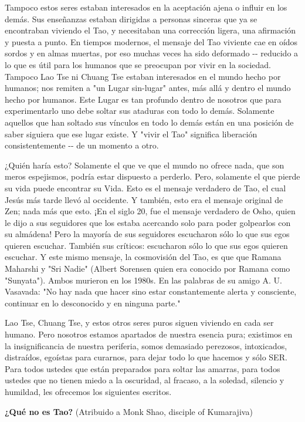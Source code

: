Tampoco estos seres estaban interesados en la aceptación ajena o influir
en los demás. Sus enseñanzas estaban dirigidas a personas sinceras que
ya se encontraban viviendo el Tao, y necesitaban una corrección ligera,
una afirmación y puesta a punto. En tiempos modernos, el mensaje del Tao
viviente cae en oídos sordos y en almas muertas, por eso muchas veces ha
sido deformado -\/- reducido a lo que es útil para los humanos que se
preocupan por vivir en la sociedad. Tampoco Lao Tse ni Chuang Tse
estaban interesados en el mundo hecho por humanos; nos remiten a "un
Lugar sin-lugar" antes, más allá y dentro el mundo hecho por humanos.
Este Lugar es tan profundo dentro de nosotros que para experimentarlo
uno debe soltar sus ataduras con todo lo demás. Solamente aquellos que
han soltado sus vínculos en todo lo demás están en una posición de saber
siguiera que ese lugar existe. Y "vivir el Tao" significa liberación
consistentemente -\/- de un momento a otro.

¿Quién haría esto? Solamente el que ve que el mundo no ofrece nada, que
son meros espejismos, podría estar dispuesto a perderlo. Pero, solamente
el que pierde su vida puede encontrar su Vida. Esto es el mensaje
verdadero de Tao, el cual Jesús más tarde llevó al occidente. Y también,
esto era el mensaje original de Zen; nada más que esto. ¡En el siglo 20,
fue el mensaje verdadero de Osho, quien le dijo a sus seguidores que los
estaba acercando solo para poder golpearlos con su almádena! Pero la
mayoría de sus seguidores escucharon sólo lo que sus egos quieren
escuchar. También sus críticos: escucharon sólo lo que sus egos quieren
escuchar. Y este mismo mensaje, la cosmovisión del Tao, es que que
Ramana Maharshi y "Sri Nadie" (Albert Sorensen quien era conocido por
Ramana como "Sunyata"). Ambos murieron en los 1980s. En las palabras de
su amigo A. U. Vasavada: "No hay nada que hacer sino estar
constantemente alerta y consciente, continuar en lo desconocido y en
ninguna parte."

Lao Tse, Chuang Tse, y estos otros seres puros siguen viviendo en cada
ser humano. Pero nosotros estamos apartados de nuestra esencia pura;
existimos en la insignificancia de nuestra periferia, somos demasiado
perezosos, intoxicados, distraídos, egoístas para curarnos, para dejar
todo lo que hacemos y sólo SER. Para todos ustedes que están preparados
para soltar las amarras, para todos ustedes que no tienen miedo a la
oscuridad, al fracaso, a la soledad, silencio y humildad, les ofrecemos
los siguientes escritos.

\textbf{{¿Qué no es Tao?}} (Atribuido a Monk Shao, disciple of
Kumarajiva)


